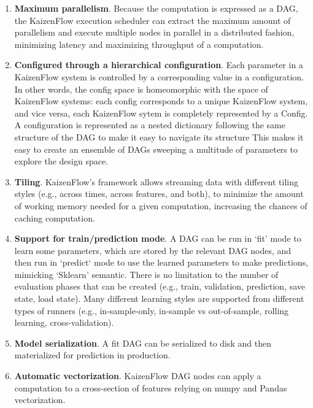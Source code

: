 \documentclass[11pt, reqno]{amsart}
\theoremstyle{definition}
\theoremstyle{remark}
\begin{document}
\begin{enumerate}
    \item \textbf{Maximum parallelism}. Because the computation is expressed as a
      DAG, the KaizenFlow execution scheduler can extract the maximum amount of
      parallelism and execute multiple nodes in parallel in a distributed
      fashion, minimizing latency and maximizing throughput of a computation.

    \item \textbf{Configured through a hierarchical configuration}. Each parameter
      in a KaizenFlow system is controlled by a corresponding value in a configuration.
      In other words, the config space is homeomorphic with the space of KaizenFlow
      systems: each config corresponds to a unique KaizenFlow system, and vice versa,
      each KaizenFlow sytem is completely represented by a Config. A configuration
      is represented as a nested dictionary following the same structure of the DAG
      to make it easy to navigate its structure This makes it easy to create an ensemble
      of DAGs sweeping a multitude of parameters to explore the design space.

    \item \textbf{Tiling}. KaizenFlow's framework allows streaming data with different
      tiling styles (e.g., across times, across features, and both), to minimize
      the amount of working memory needed for a given computation, increasing the
      chances of caching computation.

    \item \textbf{Support for train/prediction mode}. A DAG can be run in `fit' mode
      to learn some parameters, which are stored by the relevant DAG nodes, and then
      run in `predict` mode to use the learned parameters to make predictions,
      mimicking `Sklearn' semantic. There is no limitation to the number of evaluation
      phases that can be created (e.g., train, validation, prediction, save state,
      load state). Many different learning styles are supported from different
      types of runners (e.g., in-sample-only, in-sample vs out-of-sample, rolling
      learning, cross-validation).

    \item \textbf{Model serialization}. A fit DAG can be serialized to disk and then
      materialized for prediction in production.

    \item \textbf{Automatic vectorization}. KaizenFlow DAG nodes can apply a computation
      to a cross-section of features relying on numpy and Pandas vectorization.


\end{enumerate}
\end{document}
